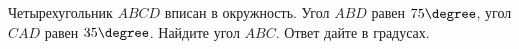 \begin{ex}
	\begin{condition}
		 Четырехугольник \( ABCD  \) вписан в окружность. Угол \( ABD  \) равен \( 75\degree \), угол \( CAD  \) равен \( 35\degree\). Найдите угол \( ABC \). Ответ дайте в градусах.
	\end{condition}
\end{ex}